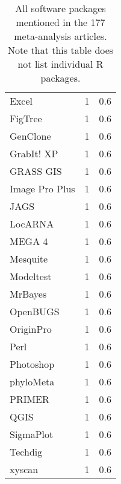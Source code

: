 \begin{table}[ht]
\begin{tabular}{lrr}
  Excel & 1 & 0.6 \\ 
  FigTree & 1 & 0.6 \\ 
  GenClone & 1 & 0.6 \\ 
  GrabIt! XP & 1 & 0.6 \\ 
  GRASS GIS & 1 & 0.6 \\ 
  Image Pro Plus & 1 & 0.6 \\ 
  JAGS & 1 & 0.6 \\ 
  LocARNA & 1 & 0.6 \\ 
  MEGA 4 & 1 & 0.6 \\ 
  Mesquite & 1 & 0.6 \\ 
  Modeltest & 1 & 0.6 \\ 
  MrBayes & 1 & 0.6 \\ 
  OpenBUGS & 1 & 0.6 \\ 
  OriginPro & 1 & 0.6 \\ 
  Perl & 1 & 0.6 \\ 
  Photoshop & 1 & 0.6 \\ 
  phyloMeta & 1 & 0.6 \\ 
  PRIMER & 1 & 0.6 \\ 
  QGIS & 1 & 0.6 \\ 
  SigmaPlot & 1 & 0.6 \\ 
  Techdig & 1 & 0.6 \\ 
  xyscan & 1 & 0.6 \\ 
   \hline
\end{tabular}
\caption{All software packages mentioned in the 177 meta-analysis articles. Note that this table does not list individual R packages.} 
\label{tab:app_ma_res_all_software_mentions}
\end{table}
